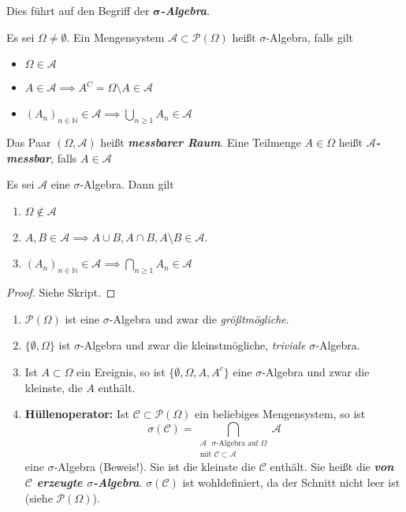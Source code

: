\documentclass[a4paper, landscape,twocolumn,fontsize=9pt]{scrartcl}
\newcommand{\vip}[1]{\textit{\textbf{#1}}}
\begin{document}
Dies führt auf den Begriff der $\mathbf{\sigma}$\vip{-Algebra}.

\begin{definition}{}{}
	Es sei $\Omega \neq \emptyset$. Ein Mengensystem $\mathcal A \subset \mathcal P(\Omega)$ heißt $\sigma$-Algebra, falls gilt
	\begin{itemize}
		\item $\Omega \in \mathcal A$
		\item $A \in \mathcal A \implies A^C = \Omega \setminus A \in \mathcal A$
		\item $(A_n)_{n \in \mathbb N} \in \mathcal A \implies \bigcup_{n \geq 1} A_n \in \mathcal A$
	\end{itemize}
	Das Paar $(\Omega, \mathcal A)$ heißt \vip{messbarer Raum}. Eine Teilmenge $A \in \Omega$ heißt \vip{$\mathcal A$-messbar}, falls $A \in \mathcal A$
\end{definition}

\begin{lemma}{}{}
Es sei $\mathcal A$ eine $\sigma$-Algebra. Dann gilt
\begin{enumerate}
	\item $\Omega \notin \mathcal A$
	\item $A,B \in \mathcal A \implies A \cup B, A \cap B, A \setminus B \in \mathcal A$.
	\item $(A_n)_{n \in \mathbb N} \in \mathcal A \implies \bigcap_{n \geq 1} A_n \in \mathcal A$
\end{enumerate}	
\end{lemma}

\begin{proof}
	Siehe Skript.
\end{proof}

\begin{example}{}{}
\begin{enumerate}
	\item $\mathcal P(\Omega)$ ist eine $\sigma$-Algebra und zwar die \emph{größtmögliche}.
	\item $\{ \emptyset, \Omega \}$ ist $\sigma$-Algebra und zwar die kleinstmögliche, \emph{triviale} $\sigma$-Algebra.
	\item Ist $A \subset \Omega$ ein Ereignis, so ist $\{ \emptyset, \Omega, A, A^c \}$ eine $\sigma$-Algebra und zwar die kleinste, die $A$ enthält.
	\item \textbf{Hüllenoperator:} Ist $\mathcal C \subset \mathcal P(\Omega)$ ein beliebiges Mengensystem, so ist
	\[
		\sigma(\mathcal C) = \bigcap_{\substack{\mathcal A \text{ $\sigma$-Algebra auf $\Omega$} \\ \text{mit $\mathcal C \subset \mathcal A$}}} \mathcal A
	\]
	eine $\sigma$-Algebra (Beweis!). Sie ist die kleinste die $\mathcal C$ enthält. Sie heißt die \vip{von $\mathcal C$ erzeugte $\sigma$-Algebra}. $\sigma(\mathcal C)$ ist wohldefiniert, da der Schnitt nicht leer ist (siehe $\mathcal P(\Omega)$).
\end{enumerate}	
\end{example}
\end{document}
